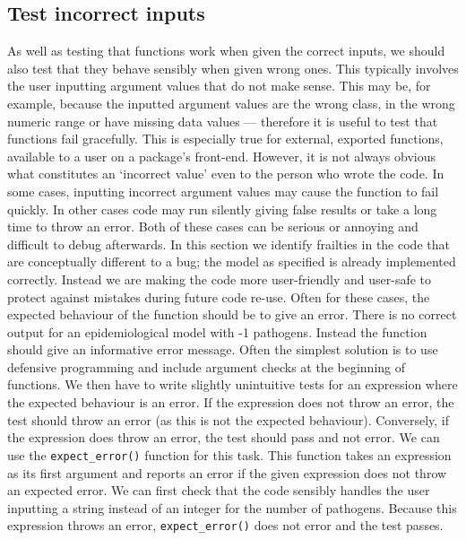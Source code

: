 \documentclass[]{elsarticle} %
\begin{document}
\hypertarget{testincorrect}{%
\subsection*{Test incorrect inputs}\label{testincorrect}}

As well as testing that functions work when given the correct inputs, we should also test that they behave sensibly when given wrong ones.
This typically involves the user inputting argument values that do not make sense.
This may be, for example, because the inputted argument values are the wrong class, in the wrong numeric range or have missing data values --- therefore it is useful to test that functions fail gracefully.
This is especially true for external, exported functions, available to a user on a package's front-end.
However, it is not always obvious what constitutes an `incorrect value' even to the person who wrote the code.
In some cases, inputting incorrect argument values may cause the function to fail quickly.
In other cases code may run silently giving false results or take a long time to throw an error.
Both of these cases can be serious or annoying and difficult to debug afterwards.
In this section we identify frailties in the code that are conceptually different to a bug; the model as specified is already implemented correctly.
Instead we are making the code more user-friendly and user-safe to protect against mistakes during future code re-use.
\newline
\newline
Often for these cases, the expected behaviour of the function should be to give an error.
There is no correct output for an epidemiological model with -1 pathogens.
Instead the function should give an informative error message.
Often the simplest solution is to use defensive programming and include argument checks at the beginning of functions.
We then have to write slightly unintuitive tests for an expression where the expected behaviour is an error.
If the expression does not throw an error, the test should throw an error (as this is not the expected behaviour).
Conversely, if the expression does throw an error, the test should pass and not error.
We can use the \texttt{expect\_error()} function for this task.
This function takes an expression as its first argument and reports an error if the given expression does not throw an expected error.
\newline
\newline
We can first check that the code sensibly handles the user inputting a string instead of an integer for the number of pathogens.
Because this expression throws an error, \texttt{expect\_error()} does not error and the test passes.
\newline
{}\label{wrong1}
\end{document}
